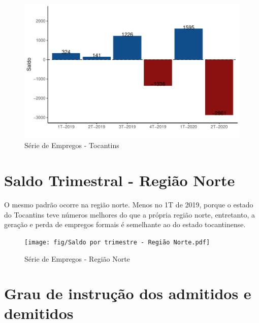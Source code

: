 \begin{figure}[h]
	\caption{Série de Empregos - Tocantins}
	\includegraphics[width=\linewidth]{fig/Saldo por trimestre - Tocantins.pdf}
\end{figure}

\section{Saldo Trimestral - Região Norte}
\par O mesmo padrão ocorre na região norte. Menos no 1T de 2019, porque o estado do Tocantins teve números melhores do que a própria região norte, entretanto, a geração e perda de empregos formais é semelhante ao do estado tocantinense.

\begin{figure}[h]
	\caption{Série de Empregos - Região Norte}
	\texttt{[image: fig/Saldo por trimestre - Região Norte.pdf]}
\end{figure}
\newpage

\section{Grau de instrução dos admitidos e demitidos}

